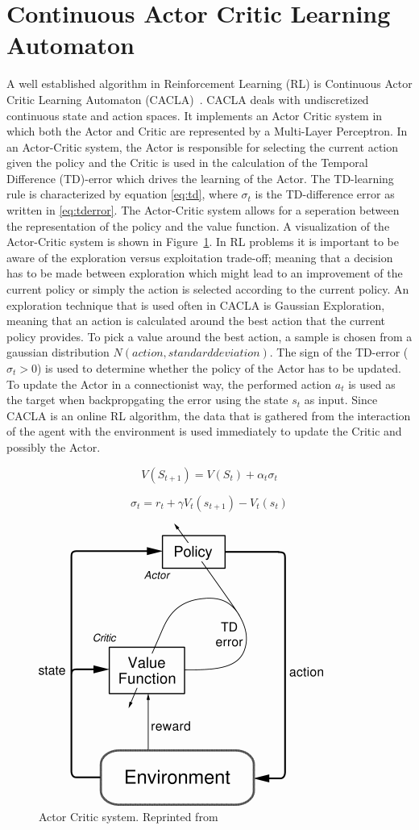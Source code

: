 
\section{Continuous Actor Critic Learning Automaton}
A well established algorithm in Reinforcement Learning (RL) is Continuous Actor Critic Learning Automaton (CACLA)~\cite{van2007reinforcement}. CACLA deals with undiscretized continuous state and action spaces. It implements an Actor Critic system in which both the Actor and Critic are represented by a Multi-Layer Perceptron. In an Actor-Critic system, the Actor is responsible for selecting the current action given the policy and the Critic is used in the calculation of the Temporal Difference (TD)-error which drives the learning of the Actor. The TD-learning rule is characterized by equation \eqref{eq:td}, where $\sigma_{t}$ is the TD-difference error as written in \eqref{eq:tderror}. The Actor-Critic system allows for a seperation between the representation of the policy and the value function. A visualization of the Actor-Critic system is shown in Figure~\ref{fig:actorcriticsystem}. In RL problems it is important to be aware of the exploration versus exploitation trade-off; meaning that a decision has to be made between exploration which might lead to an improvement of the current policy or simply the action is selected according to the current policy. An exploration technique that is used often in CACLA is Gaussian Exploration, meaning that an action is calculated around the best action that the current policy provides. To pick a value around the best action, a sample is chosen from a gaussian distribution $N(action, standard deviation)$. The sign of the TD-error ($\sigma_{t} > 0$) is used to determine whether the policy of the Actor has to be updated. To update the Actor in a connectionist way, the performed action $a_{t}$ is used as the target when backpropgating the error using the state $s_{t}$ as input. Since CACLA is an online RL algorithm, the data that is gathered from the interaction of the agent with the environment is used immediately to update the Critic and possibly the Actor. 

\begin{equation}
\label{eq:td}
V(S_{t+1}) = V(S_t) + \alpha_{t} \sigma_{t}
\end{equation}

\begin{equation}
\label{eq:tderror}
\sigma_{t} = r_{t} + \gamma V_{t}(s_{t+1}) - V_{t}(s_{t})
\end{equation}

\begin{figure}[t]
 \centering 
    \includegraphics[width = 0.35\columnwidth]{figs/actorcritic.png}
 \caption{Actor Critic system. Reprinted from~\cite{sutton1998reinforcement}}
\label{fig:actorcriticsystem}
\end{figure}



